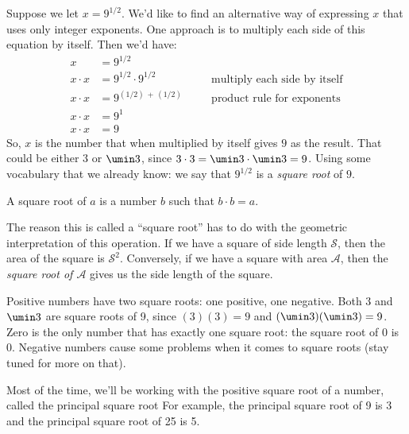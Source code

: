 Suppose we let $x = 9^{1/2}$. We'd like to find an alternative way of expressing $x$ that uses only integer exponents. One approach is to multiply each side of this equation by itself. Then we'd have:
\[\begin{aligned}
x 			&= 9^{1/2}\\
x\cdot x 	&= 9^{1/2} \cdot 9^{1/2}
&&\quad\text{multiply each side by itself}\\
x\cdot x	&= 9^{(1/2)\,+\,(1/2)}
&&\quad\text{product rule for exponents}\\
x\cdot x	&= 9^{1}\\
x\cdot x	&= 9
\end{aligned}\]
So, $x$ is the number that when multiplied by itself gives $9$ as the result. That could be either $3$ or $\umin3$, since $3\cdot 3 = \umin3 \cdot \umin3 = 9$. Using some vocabulary that we already know: we say that $9^{1/2}$ is a \textit{square root} of $9$.

\begin{boxdef}
A \gls{square root} of $a$ is a number $b$ such that $b \cdot b = a$.
\end{boxdef}

The reason this is called a ``square root'' has to do with the geometric interpretation of this operation. If we have a square of side length $\mathcal{S}$, then the area of the square is $\mathcal{S}^2$. Conversely, if we have a square with area $\mathcal{A}$, then the \textit{square root of $\mathcal{A}$} gives us the side length of the square. 

\begin{center}\end{center}

Positive numbers have two square roots: one positive, one negative. Both 3 and $\umin3$ are square roots of 9, since $(3)(3) = 9$ and $(\umin3)(\umin3) = 9$. Zero is the only number that has exactly one square root: the square root of 0 is 0. Negative numbers cause some problems when it comes to square roots (stay tuned for more on that).

Most of the time, we'll be working with the positive square root of a number, called the \gls{principal square root} For example, the principal square root of 9 is 3 and the principal square root of 25 is 5.


